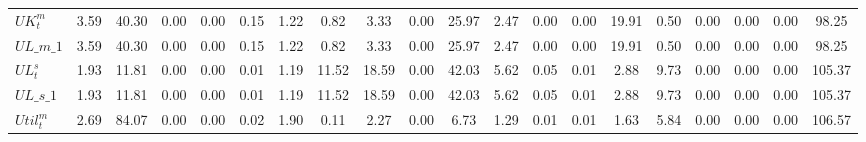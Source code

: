 \begin{center}
\begin{longtable}{lccccccccccccccccccc}
$  UK^m_t                   $	 & 	                3.59	 & 	               40.30	 & 	                0.00	 & 	                0.00	 & 	                0.15	 & 	                1.22	 & 	                0.82	 & 	                3.33	 & 	                0.00	 & 	               25.97	 & 	                2.47	 & 	                0.00	 & 	                0.00	 & 	               19.91	 & 	                0.50	 & 	                0.00	 & 	                0.00	 & 	                0.00	 & 	               98.25 \\ 
$UL\_m\_1                   $	 & 	                3.59	 & 	               40.30	 & 	                0.00	 & 	                0.00	 & 	                0.15	 & 	                1.22	 & 	                0.82	 & 	                3.33	 & 	                0.00	 & 	               25.97	 & 	                2.47	 & 	                0.00	 & 	                0.00	 & 	               19.91	 & 	                0.50	 & 	                0.00	 & 	                0.00	 & 	                0.00	 & 	               98.25 \\ 
$  UL^s_t                   $	 & 	                1.93	 & 	               11.81	 & 	                0.00	 & 	                0.00	 & 	                0.01	 & 	                1.19	 & 	               11.52	 & 	               18.59	 & 	                0.00	 & 	               42.03	 & 	                5.62	 & 	                0.05	 & 	                0.01	 & 	                2.88	 & 	                9.73	 & 	                0.00	 & 	                0.00	 & 	                0.00	 & 	              105.37 \\ 
$UL\_s\_1                   $	 & 	                1.93	 & 	               11.81	 & 	                0.00	 & 	                0.00	 & 	                0.01	 & 	                1.19	 & 	               11.52	 & 	               18.59	 & 	                0.00	 & 	               42.03	 & 	                5.62	 & 	                0.05	 & 	                0.01	 & 	                2.88	 & 	                9.73	 & 	                0.00	 & 	                0.00	 & 	                0.00	 & 	              105.37 \\ 
$ Util^m_t                  $	 & 	                2.69	 & 	               84.07	 & 	                0.00	 & 	                0.00	 & 	                0.02	 & 	                1.90	 & 	                0.11	 & 	                2.27	 & 	                0.00	 & 	                6.73	 & 	                1.29	 & 	                0.01	 & 	                0.01	 & 	                1.63	 & 	                5.84	 & 	                0.00	 & 	                0.00	 & 	                0.00	 & 	              106.57 \\ 

\end{longtable}
\end{center}
